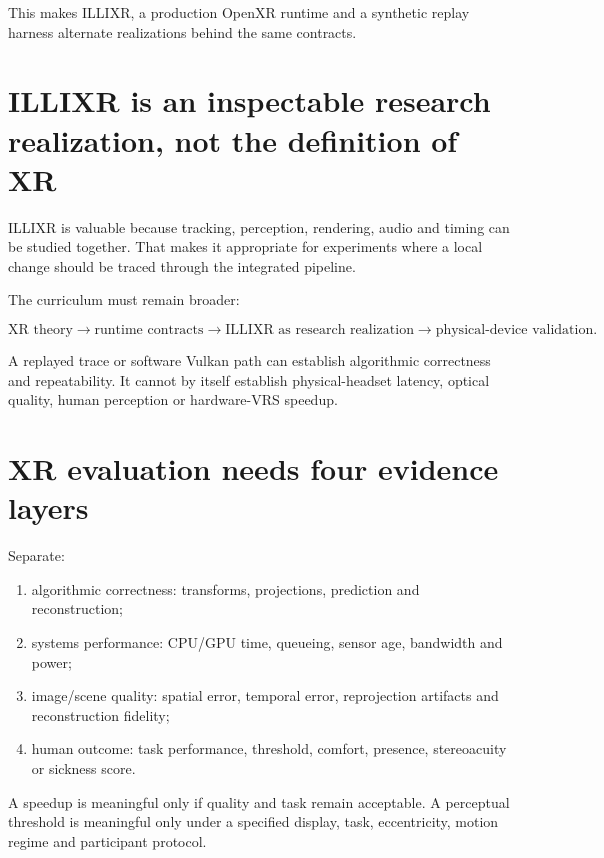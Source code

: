 This makes ILLIXR, a production OpenXR runtime and a synthetic replay harness alternate realizations behind the same contracts.

\section{ILLIXR is an inspectable research realization, not the definition of XR}\label{04-visual-computing-ii-ch035-illixr-is-an-inspectable-research-realization-not-the-definition-of-xr}

ILLIXR is valuable because tracking, perception, rendering, audio and timing can be studied together. That makes it appropriate for experiments where a local change should be traced through the integrated pipeline.

The curriculum must remain broader:

\[
\text{XR theory}\rightarrow
\text{runtime contracts}\rightarrow
\text{ILLIXR as research realization}\rightarrow
\text{physical-device validation}.
\]

A replayed trace or software Vulkan path can establish algorithmic correctness and repeatability. It cannot by itself establish physical-headset latency, optical quality, human perception or hardware-VRS speedup.

\section{XR evaluation needs four evidence layers}\label{04-visual-computing-ii-ch035-xr-evaluation-needs-four-evidence-layers}

Separate:

\begin{enumerate}
\def\labelenumi{\arabic{enumi}.}
\tightlist
\item
  algorithmic correctness: transforms, projections, prediction and reconstruction;
\item
  systems performance: CPU/GPU time, queueing, sensor age, bandwidth and power;
\item
  image/scene quality: spatial error, temporal error, reprojection artifacts and reconstruction fidelity;
\item
  human outcome: task performance, threshold, comfort, presence, stereoacuity or sickness score.
\end{enumerate}

A speedup is meaningful only if quality and task remain acceptable. A perceptual threshold is meaningful only under a specified display, task, eccentricity, motion regime and participant protocol.

